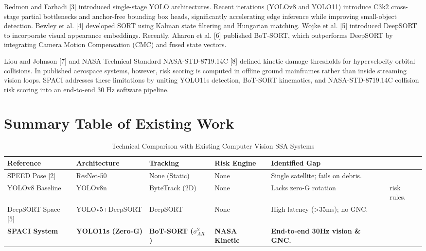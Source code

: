\documentclass[12pt]{report}
\begin{document}
Redmon and Farhadi [3] introduced single-stage YOLO architectures. Recent iterations (YOLOv8 and YOLO11) introduce C3k2 cross-stage partial bottlenecks and anchor-free bounding box heads, significantly accelerating edge inference while improving small-object detection. Bewley et al. [4] developed SORT using Kalman state filtering and Hungarian matching. Wojke et al. [5] introduced DeepSORT to incorporate visual appearance embeddings. Recently, Aharon et al. [6] published BoT-SORT, which outperforms DeepSORT by integrating Camera Motion Compensation (CMC) and fused state vectors.

Liou and Johnson [7] and NASA Technical Standard NASA-STD-8719.14C [8] defined kinetic damage thresholds for hypervelocity orbital collisions. In published aerospace systems, however, risk scoring is computed in offline ground mainframes rather than inside streaming vision loops. SPACI addresses these limitations by uniting YOLO11s detection, BoT-SORT kinematics, and NASA-STD-8719.14C collision risk scoring into an end-to-end 30 Hz software pipeline.

\section{Summary Table of Existing Work}
\begin{table}[h]
\centering
\small
\begin{tabular}{|p{1.2in}|p{1.2in}|p{1.2in}|p{1.1in}|p{1.2in}|}
\hline
\textbf{Reference} & \textbf{Architecture} & \textbf{Tracking} & \textbf{Risk Engine} & \textbf{Identified Gap} \\ \hline
SPEED Pose [2] & ResNet-50 & None (Static) & None & Single satellite; fails on debris. \\ \hline
YOLOv8 Baseline & YOLOv8n & ByteTrack (2D) & None & Lacks zero-G rotation & risk rules. \\ \hline
DeepSORT Space [5] & YOLOv5+DeepSORT & DeepSORT & None & High latency (>35ms); no GNC. \\ \hline
\textbf{SPACI System} & \textbf{YOLO11s (Zero-G)} & \textbf{BoT-SORT ($\sigma^2_{AR}$)} & \textbf{NASA Kinetic} & \textbf{End-to-end 30Hz vision \& GNC.} \\ \hline
\end{tabular}
\caption{Technical Comparison with Existing Computer Vision SSA Systems}
\label{tab:lit_survey}
\end{table}
\end{document}
